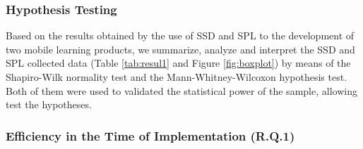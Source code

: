 \subsubsection{Hypothesis Testing}

Based on the results obtained by the use of SSD and SPL to the development of two mobile learning products, we summarize, analyze and interpret the SSD and SPL collected data (Table \ref{tab:resul1} and Figure \ref{fig:boxplot}) by means of the Shapiro-Wilk normality test and the Mann-Whitney-Wilcoxon hypothesis test. Both of them were used to validated the statistical power of the sample, allowing test the hypotheses.

\subsubsection{Efficiency in the Time of Implementation (R.Q.1)}

